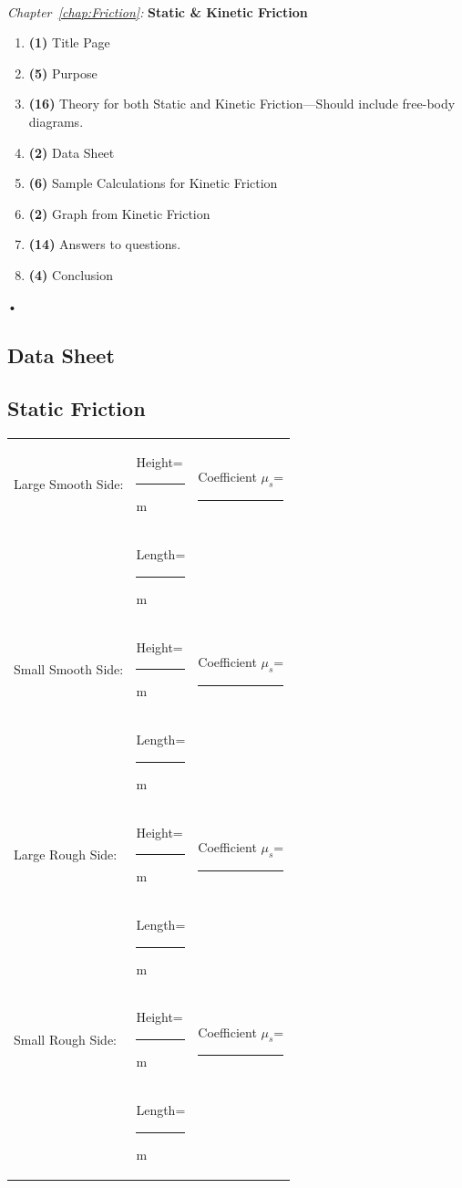 \documentclass[main.tex]{subfiles}
\begin{document}
\begin{samepage}
\hrulefill \\
\emph{Chapter~\ref{chap:Friction}:} \textbf{Static \& Kinetic Friction}
\begin{enumerate}
\item
\textbf{(1)} Title Page
\item
\textbf{(5)} Purpose
\item
\textbf{(16)} Theory for both Static and Kinetic Friction---Should include free-body diagrams.
\item
\textbf{(2)} Data Sheet
\item
\textbf{(6)} Sample Calculations for Kinetic Friction
\item
\textbf{(2)} Graph from Kinetic Friction
\item
\textbf{(14)} Answers to questions.
\item
\textbf{(4)} Conclusion
\end{enumerate}•

\newpage
\begin{doublespace}
\section{Data Sheet}
\subsection*{Static Friction}
\begin{tabular}{lll}
Large Smooth Side: & Height=\rule[-1mm]{2.5cm}{.1pt}m & Coefficient $\mu_s$=\rule[-1mm]{2.5cm}{.1pt}\\
& Length=\rule[-1mm]{2.5cm}{.1pt}m &\\

Small Smooth Side: & Height=\rule[-1mm]{2.5cm}{.1pt}m & Coefficient $\mu_s$=\rule[-1mm]{2.5cm}{.1pt}\\
& Length=\rule[-1mm]{2.5cm}{.1pt}m &\\

Large Rough Side:& Height=\rule[-1mm]{2.5cm}{.1pt}m & Coefficient $\mu_s$=\rule[-1mm]{2.5cm}{.1pt}\\
& Length=\rule[-1mm]{2.5cm}{.1pt}m &\\

Small Rough Side: & Height=\rule[-1mm]{2.5cm}{.1pt}m & Coefficient $\mu_s$=\rule[-1mm]{2.5cm}{.1pt}\\
& Length=\rule[-1mm]{2.5cm}{.1pt}m &\\
\end{tabular}\\


\end{doublespace}
\end{samepage}
\end{document}
